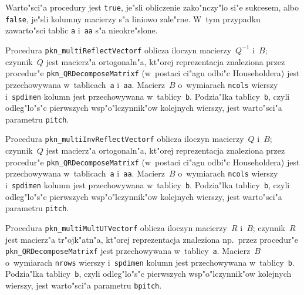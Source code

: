 Warto"sci"a procedury jest \texttt{true}, je"sli obliczenie zako"nczy"lo si"e
sukcesem, albo \texttt{false}, je"sli kolumny macierzy s"a liniowo zale"rne.
W~tym przypadku zawarto"sci tablic \texttt{a} i~\texttt{aa} s"a nieokre"slone.

Procedura \texttt{pkn\_multiReflectVectorf} oblicza iloczyn macierzy~$Q^{-1}$
i~$B$; czynnik~$Q$ jest macierz"a ortogonaln"a, kt"orej reprezentacja
znaleziona przez procedur"e \texttt{pkn\_QRDecomposeMatrixf} (w~postaci
ci"agu odbi"c Householdera) jest przechowywana w~tablicach~\texttt{a}
i~\texttt{aa}. Macierz~$B$ o~wymiarach \texttt{ncols} wierszy
i~\texttt{spdimen} kolumn jest przechowywana w~tablicy~\texttt{b}.
Podzia"lka tablicy~\texttt{b}, czyli odleg"lo"s"c pierwszych
wsp"o"lczynnik"ow kolejnych wierszy, jest warto"sci"a parametru
\texttt{pitch}.

\vspace{\bigskipamount}
Procedura \texttt{pkn\_multiInvReflectVectorf} oblicza iloczyn macierzy~$Q$
i~$B$; czynnik~$Q$ jest macierz"a ortogonaln"a, kt"orej reprezentacja
znaleziona przez procedur"e \texttt{pkn\_QRDecomposeMatrixf} (w~postaci
ci"agu odbi"c Householdera) jest przechowywana w~tablicach~\texttt{a}
i~\texttt{aa}. Macierz~$B$ o~wymiarach \texttt{ncols} wierszy
i~\texttt{spdimen} kolumn jest przechowywana w~tablicy~\texttt{b}.
Podzia"lka tablicy~\texttt{b}, czyli odleg"lo"s"c pierwszych
wsp"o"lczynnik"ow kolejnych wierszy, jest warto"sci"a parametru
\texttt{pitch}.

\vspace{\bigskipamount}
{}
\begin{sloppypar}
Procedura \texttt{pkn\_multiMultUTVectorf} oblicza iloczyn macierzy~$R$
i~$B$; czynnik~$R$ jest macierz"a tr"ojk"atn"a, kt"orej reprezentacja
znaleziona np.\ przez procedur"e \texttt{pkn\_QRDecomposeMatrixf} jest
przechowywana w~tablicy~\texttt{a}. Macierz~$B$ o~wymiarach \texttt{nrows}
wierszy i~\texttt{spdimen} kolumn jest przechowywana w~tablicy~\texttt{b}.
Podzia"lka tablicy~\texttt{b}, czyli odleg"lo"s"c pierwszych
wsp"o"lczynnik"ow kolejnych wierszy, jest warto"sci"a parametru
\texttt{bpitch}.
\end{sloppypar}

